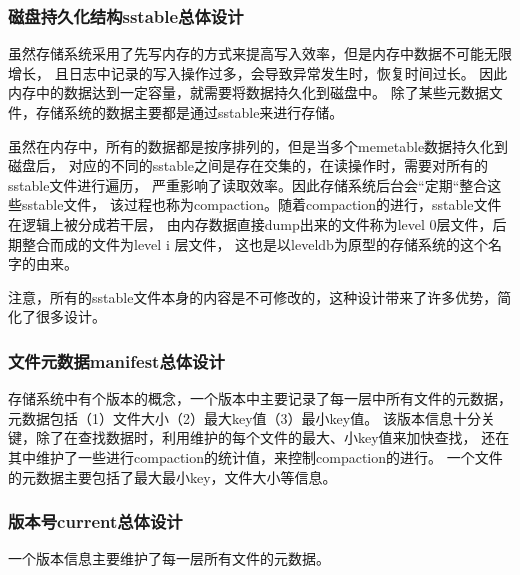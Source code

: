 		\subsubsection{磁盘持久化结构sstable总体设计}

		虽然存储系统采用了先写内存的方式来提高写入效率，但是内存中数据不可能无限增长，
		且日志中记录的写入操作过多，会导致异常发生时，恢复时间过长。
		因此内存中的数据达到一定容量，就需要将数据持久化到磁盘中。
		除了某些元数据文件，存储系统的数据主要都是通过sstable来进行存储。

		虽然在内存中，所有的数据都是按序排列的，但是当多个memetable数据持久化到磁盘后，
		对应的不同的sstable之间是存在交集的，在读操作时，需要对所有的sstable文件进行遍历，
		严重影响了读取效率。因此存储系统后台会“定期“整合这些sstable文件，
		该过程也称为compaction。随着compaction的进行，sstable文件在逻辑上被分成若干层，
		由内存数据直接dump出来的文件称为level 0层文件，后期整合而成的文件为level i 层文件，
		这也是以leveldb为原型的存储系统的这个名字的由来。

		注意，所有的sstable文件本身的内容是不可修改的，这种设计带来了许多优势，简化了很多设计。

		\subsubsection{文件元数据manifest总体设计}

		存储系统中有个版本的概念，一个版本中主要记录了每一层中所有文件的元数据，
		元数据包括（1）文件大小（2）最大key值（3）最小key值。
		该版本信息十分关键，除了在查找数据时，利用维护的每个文件的最大、小key值来加快查找，
		还在其中维护了一些进行compaction的统计值，来控制compaction的进行。
		一个文件的元数据主要包括了最大最小key，文件大小等信息。
		

		\subsubsection{版本号current总体设计}

		一个版本信息主要维护了每一层所有文件的元数据。

